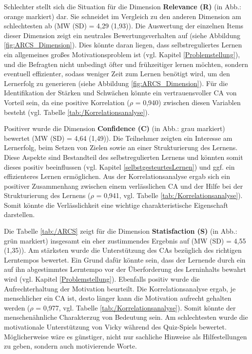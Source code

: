 Schlechter stellt sich die Situation für die Dimension \textbf{Relevance (R)} (in Abb.: orange markiert) dar. Sie schneidet im Vergleich zu den 
anderen Dimension am schlechtesten ab (MW (SD) = 4,29 (1,93)). Die Auswertung der einzelnen Items dieser Dimension
zeigt ein neutrales Bewertungsverhalten auf (siehe Abbildung \ref{fig:ARCS_Dimension}). Dies könnte daran liegen, 
dass selbstreguliertes Lernen ein allgemeines großes Motivationsproblem ist (vgl. Kapitel \ref{Problemstellung}),  und die Befragten nicht unbedingt öfter und frühzeitiger 
lernen möchten, sondern eventuell effizienter, sodass weniger Zeit zum Lernen benötigt wird, um den Lernerfolg zu generieren (siehe Abbildung \ref{fig:ARCS_Dimension}).
Für die Identifikation der Stärken und Schwächen könnte ein vertrauensvoller CA von Vorteil sein, da eine 
positive Korrelation ($\rho$ = 0,940) zwischen diesen Variablen besteht (vgl. Tabelle \ref{tab:/Korrelationsanalyse}).

Positiver wurde die Dimension \textbf{Confidence (C)} (in Abb.: grau markiert) bewertet (MW (SD) = 4,64 (1,49)).
Die Teilnehmer zeigten ein Interesse am Lernerfolg, beim Setzen von Zielen sowie an einer Strukturierung des Lernens. 
Diese Aspekte sind Bestandteil des selbstregulierten Lernens und könnten somit 
dieses positiv beeinflussen (vgl. Kapitel \ref{selbstgesteurtesLernen}) und ggf. ein effizienteres 
Lernen ermöglichen.
Aus der Korrelationsanalyse ergab sich ein positiver Zusammenhang zwischen einem verlässlichen CA und der 
Hilfe bei der Strukturierung des Lernens ($\rho$ = 0,941, vgl. Tabelle \ref{tab:/Korrelationsanalyse}). Somit könnte die Verlässlichkeit eine wichtige
charakteristische Eigenschaft darstellen.

Die Tabelle \ref{tab:/ARCS} zeigt für die Dimension \textbf{Statisfaction (S)} (in Abb.: grün markiert)
insgesamt ein eher zustimmendes Ergebnis auf (MW (SD) = 4,55 (1,35)). Am stärksten wurde die Unterstützung des CAs
bezüglich des richtigen Lerntempos bewertet. Ein Grund dafür könnte sein, dass der Lernende durch ein
auf ihn abgestimmtes Lerntempo vor der Überforderung des Lerninhalts bewahrt wird (vgl. Kapitel \ref{Problemstellung}). 
Ebenfalls positiv wurde die Aufrechterhaltung der Motivation beurteilt.
Die Korrelationsanalyse ergab, je menschlicher ein CA ist, desto länger kann die Motivation aufrecht gehalten werden ($\rho$ = 0,977, vgl. Tabelle \ref{tab:/Korrelationsanalyse}).
Somit könnte der menschenähnliche Charakterzug von Bedeutung sein.
Am schlechtesten wurde die motivationale Unterstützung von Vicky während des Quiz-Spiels bewertet.
Möglicherweise wäre es günstiger, nicht nur sachliche Hinweise als Hilfestellungen zu geben, sondern auch motivierende Worte.

